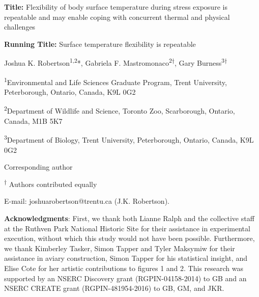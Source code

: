 \documentclass[12pt]{article}
\begin{document}
\fontsize{12pt}{12pt}\selectfont

\par\noindent \textbf{Title:} Flexibility of body surface temperature during stress exposure is repeatable and may enable coping with concurrent thermal and physical challenges
\vspace{\baselineskip}
\vspace{\baselineskip}

\par\noindent \textbf{Running Title:} Surface temperature flexibility is repeatable
\vspace{\baselineskip}

\par\noindent Joshua K. Robertson\textsuperscript{1,2}*, Gabriela F. Mastromonaco\textsuperscript{2$\dagger$}, Gary Burness\textsuperscript{3$\dagger$}

\vspace{\baselineskip}
\vspace{\baselineskip}

\par\noindent \textsuperscript{1}Environmental and Life Sciences Graduate Program, Trent University, Peterborough, Ontario, Canada, K9L 0G2
\vspace{\baselineskip}

\par\noindent \textsuperscript{2}Department of Wildlife and Science, Toronto Zoo, Scarborough, Ontario, Canada, M1B 5K7
\vspace{\baselineskip}

\par\noindent \textsuperscript{3}Department of Biology, Trent University, Peterborough, Ontario, Canada, K9L 0G2
\vspace{\baselineskip}

\par\noindent* Corresponding author
\par\noindent\textsuperscript{$\dagger$} Authors contributed equally
\par\noindent E-mail: joshuarobertson@trentu.ca (J.K. Robertson).
\vspace{\baselineskip}
\vspace{\baselineskip}

\par\noindent \textbf{Acknowledgments}: First, we thank both Lianne Ralph and the collective staff at the Ruthven Park National Historic Site for their assistance in experimental execution, without which this study would not have been possible. Furthermore, we thank Kimberley Tasker, Simon Tapper and Tyler Maksymiw for their assistance in aviary construction, Simon Tapper for his statistical insight, and Elise Cote for her artistic contributions to figures 1 and 2. This research was supported by an NSERC Discovery grant (RGPIN-04158-2014) to GB and an NSERC CREATE grant (RGPIN-481954-2016) to GB, GM, and JKR.
\vspace{\baselineskip}
\end{document}
